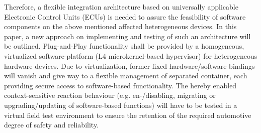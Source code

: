 Therefore, a flexible integration architecture based on universally
applicable  Electronic  Control  Units  (ECUs)  is  needed  to  assure
the  feasibility  of  software  components  on  the  above  mentioned
affected heterogeneous devices. In this paper, a new approach on
implementing and testing of such an architecture will be outlined.
Plug-and-Play functionality shall be provided by a homogeneous,
virtualized software-platform (L4 microkernel-based hypervisor)
for heterogeneous hardware devices. Due to virtualization, former
fixed  hardware/software-bindings  will  vanish  and  give  way  to
a  flexible  management  of  separated  container,  each  providing
secure access to software-based functionality. The hereby enabled
context-sensitive reaction behaviour (e.g. en-/disabling, migrating
or  upgrading/updating  of  software-based  functions)  will  have  to
be tested in a virtual field test environment to ensure the retention
of  the  required  automotive  degree  of  safety  and  reliability.


